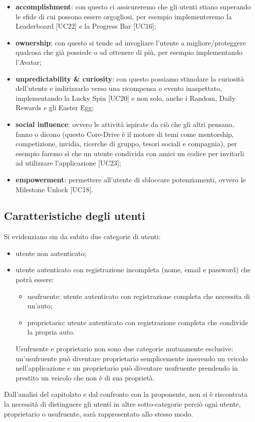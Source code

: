 \begin{itemize}
	\item \textbf{accomplishment}: con questo ci assicureremo che gli utenti stiano superando le sfide di cui possono essere orgogliosi, per esempio implementeremo la Leaderboard [UC22] e la Progress Bar [UC16];
	\item \textbf{ownership}: con questo si tende ad invogliare l'utente a migliore/proteggere qualcosa che già possiede o ad ottenere di più, per esempio implementando l'Avatar;
	\item \textbf{unpredictability \& curiosity}: con questo possiamo stimolare la curiosità dell'utente e indirizzarlo verso una ricompensa o evento inaspettato, implementando la Lucky Spin [UC20] e non solo, anche i Random, Daily Rewards e gli Easter Egg;
	\item \textbf{social influence}: ovvero le attività ispirate da ciò che gli altri pensano, fanno o dicono (questo Core-Drive è il motore di temi come mentorship, competizione, invidia, ricerche di gruppo, tesori sociali e compagnia), per esempio faremo sì che un utente condivida con amici un codice per invitarli ad utilizzare l’applicazione [UC23];
	\item \textbf{empowerment}: permettere all'utente di sbloccare potenziamenti, ovvero le Milestone Unlock [UC18].
\end{itemize}
\subsection{Caratteristiche degli utenti}
Si evidenziano sin da subito due categorie di utenti:
\begin{itemize}
	\item utente non autenticato;
	\item utente autenticato con registrazione incompleta (nome, email e password) che potrà essere:
		\begin{itemize}
			\item usufruente: utente autenticato con registrazione completa che necessita di un'auto;
			\item proprietario: utente autenticato con registrazione completa che condivide la propria auto.
		\end{itemize}
		Usufruente e proprietario non sono due categorie mutuamente esclusive: un'usufruente può diventare proprietario semplicemente inserendo un veicolo nell'applicazione e un proprietario può diventare usufruente prendendo in prestito un veicolo che non è di sua proprietà.
\end{itemize}
Dall'analisi del capitolato e dal confronto con la proponente, non si è riscontrata la necessità di distinguere gli utenti in altre sotto-categorie perciò ogni utente, proprietario o usufruente, sarà rappresentato allo stesso modo.